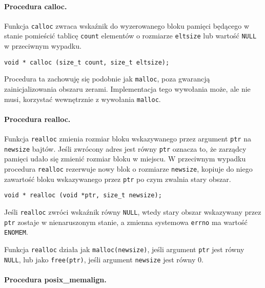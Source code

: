 \documentclass[12pt,a4paper,titlepage,twoside]{mwart}
\begin{document}
\paragraph{Procedura calloc.}

Funkcja \texttt{calloc} zwraca wskaźnik do wyzerowanego bloku pamięci będącego
w stanie pomieścić tablicę \texttt{count} elementów o rozmiarze
\texttt{eltsize} lub wartość \texttt{NULL} w przeciwnym wypadku.

\vspace{2ex}
\begin{lstlisting}[caption={Prototyp procedury \texttt{calloc}.}]
void * calloc (size_t count, size_t eltsize);
\end{lstlisting}

Procedura ta zachowuję się podobnie jak \texttt{malloc}, poza gwarancją
zainicjalizowania obszaru zerami. Implementacja tego wywołania może, ale nie
musi, korzystać wewnętrznie z wywołania \texttt{malloc}.

\paragraph{Procedura realloc.}

Funkcja \texttt{realloc} zmienia rozmiar bloku wskazywanego przez argument
\texttt{ptr} na \texttt{newsize} bajtów. Jeśli zwrócony adres jest równy
\texttt{ptr} oznacza to, że zarządcy pamięci udało się zmienić rozmiar bloku w
miejscu. W przeciwnym wypadku procedura \texttt{realloc} rezerwuje nowy blok o
rozmiarze \texttt{newsize}, kopiuje do niego zawartość bloku wskazywanego przez
\texttt{ptr} po czym zwalnia stary obszar.

\vspace{2ex}
\begin{lstlisting}[caption={Prototyp procedury \texttt{realloc}.}]
void * realloc (void *ptr, size_t newsize);
\end{lstlisting}

Jeśli \texttt{realloc} zwróci wskaźnik równy \texttt{NULL}, wtedy stary obszar
wskazywany przez \texttt{ptr} zostaje w nienaruszonym stanie, a zmienna
systemowa \texttt{errno} ma wartość \texttt{ENOMEM}.

Funkcja \texttt{realloc} działa jak \texttt{malloc(newsize)}, jeśli argument
\texttt{ptr} jest równy \texttt{NULL}, lub jako \texttt{free(ptr)}, jeśli
argument \texttt{newsize} jest równy $0$.

\paragraph{Procedura posix\_memalign.}
\end{document}
